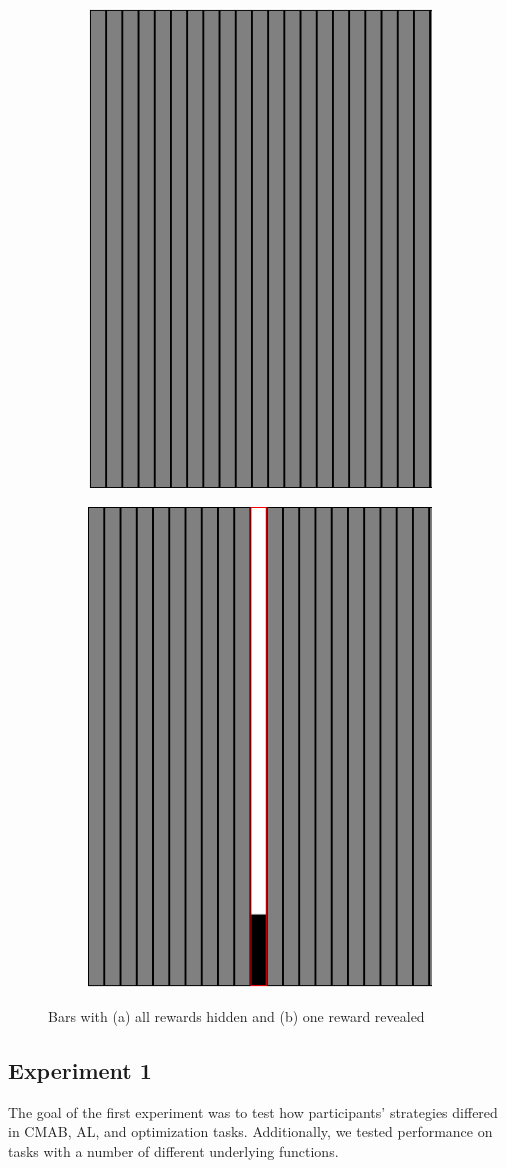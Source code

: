 \documentclass[10pt,letterpaper]{article}
\begin{document}
		\begin{figure}
			\centering
			\begin{subfigure}{.25\textwidth}
				\centering
				\includegraphics[width=.4\linewidth]{taska}
				\caption{}
				\label{fig:sub1}
			\end{subfigure}%
			\begin{subfigure}{.25\textwidth}
				\centering
				\includegraphics[width=.4\linewidth]{taskb}
				\caption{}
				\label{fig:sub2}
			\end{subfigure}
			\caption{Bars with (a) all rewards hidden and (b) one reward revealed}
			\label{fig:test}
		\end{figure}

	
	\subsection{Experiment 1}
	
	The goal of the first experiment was to test how participants' strategies differed in CMAB, AL, and optimization tasks. Additionally, we tested performance on tasks with a number of different underlying functions.
	
\end{document}

